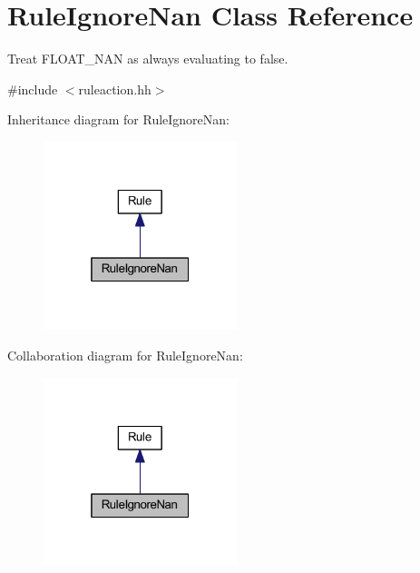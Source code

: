 \hypertarget{class_rule_ignore_nan}{}\section{Rule\+Ignore\+Nan Class Reference}
\label{class_rule_ignore_nan}


Treat F\+L\+O\+A\+T\+\_\+\+N\+AN as always evaluating to false.  




{\ttfamily \#include $<$ruleaction.\+hh$>$}



Inheritance diagram for Rule\+Ignore\+Nan\+:
\nopagebreak
\begin{figure}[H]
\begin{center}
\leavevmode
\includegraphics[width=160pt]{class_rule_ignore_nan__inherit__graph}
\end{center}
\end{figure}


Collaboration diagram for Rule\+Ignore\+Nan\+:
\nopagebreak
\begin{figure}[H]
\begin{center}
\leavevmode
\includegraphics[width=160pt]{class_rule_ignore_nan__coll__graph}
\end{center}
\end{figure}
